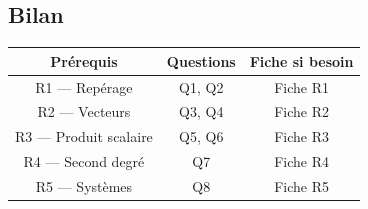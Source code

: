 \bigskip

\subsection*{Bilan}

\begin{center}
\begin{tabular}{|c|c|c|}
\hline
\textbf{Prérequis} & \textbf{Questions} & \textbf{Fiche si besoin} \\
\hline
R1 — Repérage & Q1, Q2 & Fiche R1 \\
\hline
R2 — Vecteurs & Q3, Q4 & Fiche R2 \\
\hline
R3 — Produit scalaire & Q5, Q6 & Fiche R3 \\
\hline
R4 — Second degré & Q7 & Fiche R4 \\
\hline
R5 — Systèmes & Q8 & Fiche R5 \\
\hline
\end{tabular}
\end{center}
